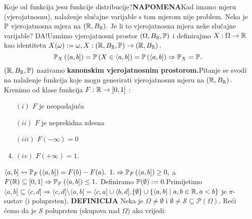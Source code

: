\documentclass{article}
\begin{document}
Koje od funkcija jesu funkcije distribucije?\newline\newline{}\textbf{NAPOMENA}\newline  Kad imamo mjeru (vjerojatnosnu), nalaženje slučajne varijable s tom mjerom nije problem. Neka je \(\Bbb P\) vjerojatnosna mjera na \((\Bbb R, B_\Bbb R).\) Je li to vjerojatnosna mjera neke slučajne varijable? DA!\newline Uzmimo vjerojatnosni prostor \(\left(\Omega, B_\Bbb R,\Bbb P\right)\) i definirajmo \(X:\Omega\to\Bbb R\) kao identitetu \(X(\omega):=\omega, X:\left(\Bbb R, B_\Bbb R,\Bbb P\right)\to\left(\Bbb R, B_\Bbb R\right).\)\[\Bbb P_X\left(\langle a,b]\right)=\Bbb P\left(X\in\langle a,b]\right)=\Bbb P\left(\langle a,b]\right)\Rightarrow\Bbb P_X=\Bbb P.\] \(\left(\Bbb R, B_\Bbb R,\Bbb P\right)\) nazivamo \textbf{kanonskim vjerojatnosnim prostorom.}\newline Pitanje se svodi na nalaženje funkcija koje mogu generirati vjerojatnosnu mjeru na \(\left(\Bbb R, B_\Bbb R\right).\)\newline\newline
Krenimo od klase funkcija \(F:\Bbb R\to[0,1]\) :
\begin{enumerate}
    \item[\((i)\)] \(F\) je neopadajuća
    \item[\((ii)\)] \(F\) je neprekidna zdesna
    \item[\((iii)\)] \(F(-\infty)=0\)
    \item\((iv)\) \(F(+\infty)=1.\)
\end{enumerate}
\(\langle a,b]\rightsquigarrow\Bbb P_F\left(\langle a,b]\right)=F(b)-F(a).\) \(1.\Rightarrow \Bbb P_F\left(\langle a,b]\right)\ge0,\) a \(F(\Bbb R)\subseteq[0,1]\Rightarrow  \Bbb P_F\left(\langle a,b]\right)\le 1.\) Definiramo \(\Bbb P(\emptyset):=0.\)\newline Primijetimo \(\langle a,b]\subseteq\langle c,d]\Rightarrow\langle c,d]\setminus\langle a,b]=\langle c,a]\cup\langle b,d].\)\newline\newline \(\{\emptyset\}\cup\left\{\langle a,b]\mid a,b\in\Bbb R,a<b\right\}\) je \(\pi\)-sustav (i poluprsten).\newline\newline
\textbf{DEFINICIJA}\newline
Neka je \(\Omega\ne\emptyset\) i \(\emptyset\ne\mathcal S\subseteq\mathcal P(\Omega).\) Reći ćemo da je \(\mathcal S\) poluprsten (skupova nad \(\Omega\)) ako vrijedi:
\end{document}
